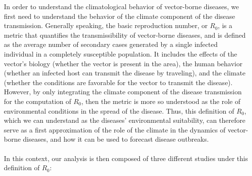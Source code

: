 \documentclass[fleqn,10pt]{wlscirep}
\begin{document}
  In order to understand the climatological behavior of vector-borne diseases, we first need to understand the behavior of the climate component of the disease transmission. Generally speaking, the basic reproduction number, or $R_0$, is a metric that quantifies the transmissibility of vector-borne diseases, and is defined as the average number of secondary cases generated by a single infected individual in a completely susceptible population. It includes the effects of the vector's biology (whether the vector is present in the area), the human behavior (whether an infected host can transmit the disease by traveling), and the climate (whether the conditions are favorable for the vector to transmit the disease). However, by only integrating the climate component of the disease transmission for the computation of $R_0$, then the metric is more so understood as the role of environmental conditions in the spread of the disease. Thus, this definition of $R_0$, which we can understand as the diseases' environmental suitability, can therefore serve as a first approximation of the role of the climate in the dynamics of vector-borne diseases, and how it can be used to forecast disease outbreaks.
\\
\\
  In this context, our analysis is then composed of three different studies under this definition of $R_0$:
\end{document}
